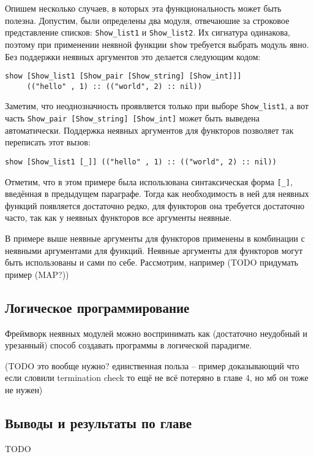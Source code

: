 \documentclass[../diploma.tex]{subfiles}
\begin{document}
Опишем несколько случаев, в которых эта функциональность может быть полезна. Допустим, были определены два модуля, отвечаюшие за строковое представление списков: \texttt{Show_list1} и \texttt{Show_list2}. Их сигнатура одинакова, поэтому при применении неявной функции \texttt{show} требуется выбрать модуль явно. Без поддержки неявных аргументов это делается следующим кодом:

\begin{verbatim}
show [Show_list1 [Show_pair [Show_string] [Show_int]]]
     (("hello" , 1) :: (("world", 2) :: nil))
\end{verbatim}

Заметим, что неоднозначность проявляется только при выборе \texttt{Show_list1}, а вот часть \texttt{Show_pair [Show_string] [Show_int]} может быть выведена автоматически. Поддержка неявных аргументов для функторов позволяет так переписать этот вызов:

\begin{verbatim}
show [Show_list1 [_]] (("hello" , 1) :: (("world", 2) :: nil))
\end{verbatim}

Отметим, что в этом примере была использована синтаксическая форма \texttt{[_]}, введённая в предыдущем параграфе. Тогда как необходимость в ней для неявных функций появляется достаточно редко, для функторов она требуется достаточно часто, так как у неявных функторов все аргументы неявные.

В примере выше неявные аргументы для функторов применены в комбинации с неявными аргументами для функций. Неявные аргументы для функторов могут быть использованы и сами по себе. Рассмотрим, например (TODO придумать пример (MAP?))

\subsection{Логическое программирование}\label{logic}

Фреймворк неявных модулей можно воспринимать как (достаточно неудобный и урезанный) способ создавать программы в логической парадигме. 

(TODO это вообще нужно? единственная польза -- пример доказывающий что если словили termination check то ещё не всё потеряно в главе 4, но мб он тоже не нужен)

\subsection{Выводы и результаты по главе}

TODO
\end{document}

